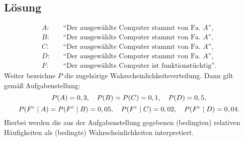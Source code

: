 \documentclass{exercise}
\begin{document}
    \subsection*{Lösung}
    \begin{align*}
        A: &\quad \text{``Der ausgewählte Computer stammt von Fa. }A\text{''},\\
        B: &\quad \text{``Der ausgewählte Computer stammt von Fa. }A\text{''},\\
        C: &\quad \text{``Der ausgewählte Computer stammt von Fa. }A\text{''},\\
        D: &\quad \text{``Der ausgewählte Computer stammt von Fa. }A\text{''},\\
        F: &\quad \text{``Der ausgewählte Computer ist funktionstüchtig''}.
    \end{align*}
    Weiter bezeichne \(P\) die zugehörige Wahrscheinlichkeitsverteilung.
    Dann gilt gemäß Aufgabenstellung:
    \[
        P\parentheses*{A} = 0,3, \quad P\parentheses*{B} = P\parentheses*{C} = 0,1, \quad P\parentheses*{D} = 0,5,
    \]
    \[
        P\parentheses*{F^c \mid A} = P\parentheses*{F^c \mid B} = 0,05, \quad P\parentheses*{F^c \mid C} = 0,02, \quad P\parentheses*{F^c \mid D} = 0,04.
    \]
    Hierbei werden die aus der Aufgabenstellung gegebenen (bedingten) relativen Häufigkeiten als (bedingte) Wahrscheinlichkeiten interpretiert.
\end{document}
